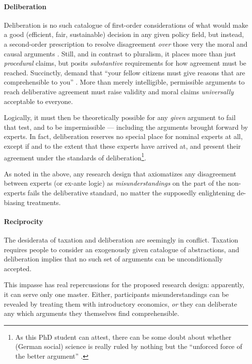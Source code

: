 \paragraph{Deliberation}
Deliberation is no such catalogue of first-order considerations of what would make a good (efficient, fair, sustainable) decision in any given policy field, but instead, a second-order prescription to resolve disagreement \emph{over} those very the moral and causal arguments \citep[K188]{GutmannThompson-2004-aa}.
Still, and in contrast to pluralism, it places more than just \emph{procedural} claims, but posits \emph{substantive} requirements for how agreement must be reached.
Succinctly, \citeauthor{GutmannThompson-2004-aa} demand that ``your fellow citizens must give reasons that are comprehensible to you'' \citeyearpar[K177]{GutmannThompson-2004-aa}.
More than merely intelligible, permissible arguments to reach deliberative agreement must raise validity \citep{Habermas-1984-aa} and moral \citep{Rawls-1971-aa} claims \emph{universally} acceptable to everyone.

Logically, it must then be theoretically possible for any \emph{given} argument to fail that test, and to be impermissible --- including the arguments brought forward by experts.
In fact, deliberation reserves no special place for nominal experts at all, except if and to the extent that these experts have arrived at, and present their agreement under the standards of deliberation\footnote{
	As this PhD student can attest, there can be some doubt about whether (German social) science is really ruled by nothing but the ``unforced force of the better argument'' \citep{Habermas1984}.}.
	
As noted in the above, any research design that axiomatizes any disagreement between experts (or ex-ante logic) as \emph{misunderstandings} on the part of the non-experts fails the deliberative standard, no matter the supposedly enlightening de-biasing treatments.

\paragraph{Reciprocity}
The desiderata of taxation and deliberation are seemingly in conflict.
Taxation requires people to consider an exogenously given catalogue of abstractions, and deliberation implies that no such set of arguments can be unconditionally accepted.

This impasse has real repercussions for the proposed research design: apparently, it can serve only one master.
Either, participants misunderstandings can be revealed by treating them with introductory economics, \emph{or} they can deliberate any which arguments they themselves find comprehensible.

